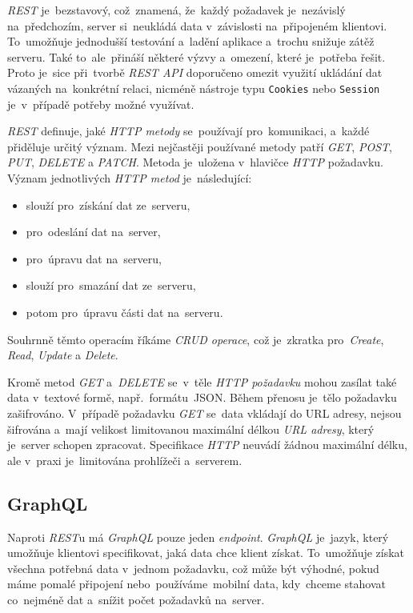\documentclass[10pt,a4paper]{article}
\newcommand{\harddata}[1]{\boxed{\texttt{#1}}}
\begin{document}
            \emph{REST} je~bezstavový, což~znamená, že~každý požadavek je~nezávislý na~předchozím, server si~neukládá data v~závislosti na~připojeném klientovi. To~umožňuje jednodušší testování a~ladění aplikace a~trochu snižuje zátěž serveru. Také to~ale~přináší některé výzvy a~omezení, které je~potřeba řešit. Proto je~sice při~tvorbě \emph{REST API} doporučeno omezit využití ukládání dat vázaných na~konkrétní relaci, nicméně nástroje typu \texttt{Cookies} nebo \texttt{Session} je~v~případě potřeby možné využívat.
            
            \emph{REST} definuje, jaké \emph{HTTP metody} se~používají pro~komunikaci, a~každé přiděluje určitý význam. Mezi nejčastěji používané metody patří \emph{GET}, \emph{POST}, \emph{PUT}, \emph{DELETE} a \emph{PATCH}. Metoda je~uložena v~hlavičce \emph{HTTP} požadavku. Význam jednotlivých \emph{HTTP metod} je~následující:
            
            \begin{itemize}
                \item \harddata{GET} slouží pro~získání dat ze~serveru,
                \item \harddata{POST} pro~odeslání dat na~server,
                \item \harddata{PUT} pro~úpravu dat na~serveru,
                \item \harddata{DELETE} slouží pro~smazání dat ze~serveru,
                \item \harddata{PATCH} potom pro~úpravu části dat na~serveru.
            \end{itemize}

            Souhrnně těmto operacím říkáme \emph{CRUD operace}, což je~zkratka pro~\emph{Create}, \emph{Read}, \emph{Update} a \emph{Delete}.

            Kromě metod \emph{GET} a~\emph{DELETE} se~v~těle \emph{HTTP požadavku} mohou zasílat také data v~textové formě, např.~formátu~JSON. Během přenosu je~tělo požadavku zašifrováno. V~případě požadavku \emph{GET} se~data vkládají do URL adresy, nejsou šifrována a~mají velikost limitovanou maximální délkou \emph{URL adresy}, který je~server schopen zpracovat. Specifikace \emph{HTTP} neuvádí žádnou maximální délku, ale v~praxi je~limitována prohlížeči a~serverem. \cite[3.2.1]{ietf-httpbis-messaging-03}

        \subsection{GraphQL}
            Naproti \emph{REST}u má \emph{GraphQL} pouze jeden \emph{endpoint}. \emph{GraphQL} je~jazyk, který umožňuje klientovi specifikovat, jaká data chce klient získat. To~umožňuje získat všechna potřebná data v~jednom požadavku, což může být výhodné, pokud máme pomalé připojení nebo~používáme~mobilní data, kdy~chceme stahovat co~nejméně dat a~snížit počet požadavků na~server.
\end{document}
